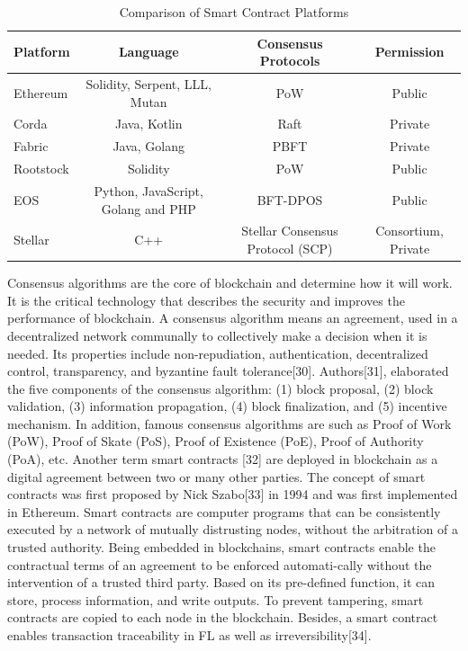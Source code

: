 \documentclass[lettersize,journal]{IEEEtran}
\begin{document}
\begin{table}[!ht]
\caption{\centering Comparison of Smart Contract Platforms}
  \centering
  \begin{tabular}{@{}lccc@{}}
    \toprule
    \textbf{Platform} & \textbf{Language} & \textbf{Consensus Protocols} & \textbf{Permission} \\
    \midrule
     Ethereum & Solidity, Serpent, LLL, Mutan & PoW & Public  \\
        Corda & Java, Kotlin & Raft & Private  \\ 
        Fabric & Java, Golang & PBFT & Private  \\ 
        Rootstock & Solidity & PoW & Public  \\ 
        EOS & Python, JavaScript, Golang and PHP & BFT-DPOS & Public  \\ 
        Stellar & C++ & Stellar Consensus Protocol (SCP) & Consortium, Private  \\
    \bottomrule
  \end{tabular}
  \label{tab:smart-contract}
\end{table}
Consensus algorithms are the core of blockchain and determine how it will work. It is the critical technology that describes the security and improves the performance of blockchain. A consensus algorithm means an agreement, used in a decentralized network communally to collectively make a decision when it is needed. Its properties include non-repudiation, authentication, decentralized control, transparency, and byzantine fault tolerance[30]. Authors[31], elaborated the five components of the consensus algorithm: (1) block proposal, (2) block validation, (3) information propagation, (4) block finalization, and (5) incentive mechanism. In addition, famous consensus algorithms are such as Proof of Work (PoW), Proof of Skate (PoS), Proof of Existence (PoE), Proof of Authority (PoA), etc. Another term smart contracts [32] are deployed in blockchain as a digital agreement between two or many other parties. The concept of smart contracts was first proposed by Nick Szabo[33] in 1994 and was first implemented in Ethereum. Smart contracts are computer programs that can be consistently executed by a network of mutually distrusting nodes, without the arbitration of a trusted authority. Being embedded in blockchains, smart contracts enable the contractual terms of an agreement to be enforced automati-cally without the intervention of a trusted third party. Based on its pre-defined function, it can store, process information, and write outputs. To prevent tampering, smart contracts are copied to each node in the blockchain. Besides, a smart contract enables transaction traceability in FL as well as irreversibility[34].
\end{document}
